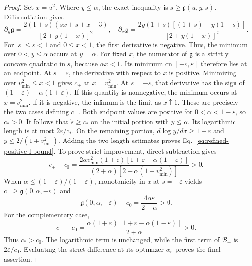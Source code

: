 \documentclass[11pt,a4paper]{article}
\numberwithin{equation}{section}
\theoremstyle{plain}
\theoremstyle{definition}
\theoremstyle{remark}
\begin{document}
\begin{proof}
Set $x=u^2$. Where $y\leqslant\alpha$, the exact inequality is $\dot s\geqslant\mathfrak g(u,y,s)$. Differentiation gives
\begin{equation}
\partial_y\mathfrak g=\frac{2(1+s)(sx+s+x-3)}{[2+y(1-x)]^2},\quad
\partial_x\mathfrak g=\frac{2y(1+s)[(1+s)-y(1-s)]}{[2+y(1-x)]^2}.
\end{equation}
For $|s|\leqslant\varepsilon<1$ and $0\leqslant x<1$, the first derivative is negative. Thus,  the minimum over $0<y\leqslant\alpha$ occurs at $y=\alpha$. For fixed $x$, the numerator of $\mathfrak g$ is a strictly concave quadratic in $s$, because $\alpha x<1$. Its minimum on $[-\varepsilon,\varepsilon]$ therefore lies at an endpoint. At $s=\varepsilon$, the derivative with respect to $x$ is positive. Minimizing over $v_{\min}^2\leqslant x<1$ gives $c_+$ at $x=v_{\min}^2$. At $s=-\varepsilon$, that derivative has the sign of $(1-\varepsilon)-\alpha(1+\varepsilon)$. If this quantity is nonnegative, the minimum occurs at $x=v_{\min}^2$. If it is negative, the infimum is the limit as $x\uparrow 1$. These are precisely the two cases defining $c_-$. Both endpoint values are positive for $0<\alpha<1-\varepsilon$, so $c_*>0$. It follows that $\dot s\geqslant c_*$ on the initial portion with $y\leqslant\alpha$. Its logarithmic length is at most $2\varepsilon/c_*$. On the remaining portion, $d\log y/d\sigma\geqslant1-\varepsilon$ and $y\leqslant2/(1+v_{\min}^2)$. Adding the two length estimates proves Eq.~\eqref{eq:refined-positive-l-bound}. To prove strict improvement, direct subtraction gives
\begin{equation}\label{eq:c-plus-strict-difference}
c_+-c_0=\frac{2\alpha v_{\min}^2(1+\varepsilon)
[1+\varepsilon-\alpha(1-\varepsilon)]}{(2+\alpha)[2+\alpha(1-v_{\min}^2)]}>0.
\end{equation}
When $\alpha\leqslant(1-\varepsilon)/(1+\varepsilon)$, monotonicity in $x$ at $s=-\varepsilon$ yields $c_-\geqslant\mathfrak g(0,\alpha,-\varepsilon)$ and
\begin{equation}\label{eq:c-minus-first-strict-difference}
\mathfrak g(0,\alpha,-\varepsilon)-c_0=\frac{4\alpha\varepsilon}{2+\alpha}>0.
\end{equation}
For the complementary case,
\begin{equation}\label{eq:c-minus-second-strict-difference}
c_--c_0=\frac{\alpha(1+\varepsilon)
[1+\varepsilon-\alpha(1-\varepsilon)]}{2+\alpha}>0.
\end{equation}
Thus $c_*>c_0$. The logarithmic term is unchanged, while the first term of $\mathcal B_+$ is $2\varepsilon/c_0$. Evaluating the strict difference at its optimizer $\alpha_\varepsilon$ proves the final assertion.
\end{proof}
\end{document}
